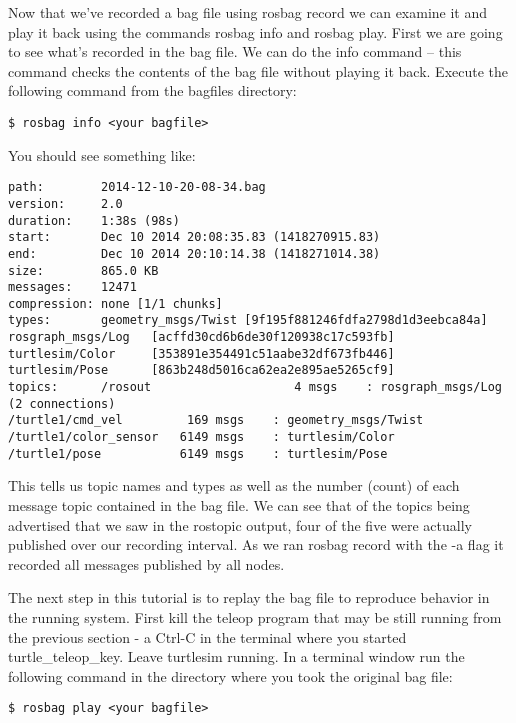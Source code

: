 Now that we've recorded a bag file using rosbag record we can examine it and play it back using the commands rosbag info and rosbag play. First we are going to see what's recorded in the bag file. We can do the info command -- this command checks the contents of the bag file without playing it back. Execute the following command from the bagfiles directory:

\begin{lstlisting}[breaklines=true languages=bash]
$ rosbag info <your bagfile>
\end{lstlisting}

You should see something like:

\begin{lstlisting}[breaklines=true languages=bash]
path:        2014-12-10-20-08-34.bag
version:     2.0
duration:    1:38s (98s)
start:       Dec 10 2014 20:08:35.83 (1418270915.83)
end:         Dec 10 2014 20:10:14.38 (1418271014.38)
size:        865.0 KB
messages:    12471
compression: none [1/1 chunks]
types:       geometry_msgs/Twist [9f195f881246fdfa2798d1d3eebca84a]
rosgraph_msgs/Log   [acffd30cd6b6de30f120938c17c593fb]
turtlesim/Color     [353891e354491c51aabe32df673fb446]
turtlesim/Pose      [863b248d5016ca62ea2e895ae5265cf9]
topics:      /rosout                    4 msgs    : rosgraph_msgs/Log   (2 connections)
/turtle1/cmd_vel         169 msgs    : geometry_msgs/Twist
/turtle1/color_sensor   6149 msgs    : turtlesim/Color    
/turtle1/pose           6149 msgs    : turtlesim/Pose
\end{lstlisting}

This tells us topic names and types as well as the number (count) of each message topic contained in the bag file. We can see that of the topics being advertised that we saw in the rostopic output, four of the five were actually published over our recording interval. As we ran rosbag record with the -a flag it recorded all messages published by all nodes.

The next step in this tutorial is to replay the bag file to reproduce behavior in the running system. First kill the teleop program that may be still running from the previous section - a Ctrl-C in the terminal where you started turtle\_teleop\_key. Leave turtlesim running. In a terminal window run the following command in the directory where you took the original bag file:

\begin{lstlisting}[breaklines=true languages=bash]
$ rosbag play <your bagfile>
\end{lstlisting}

